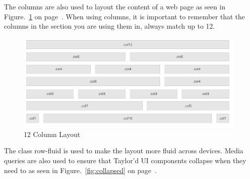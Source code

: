 The columns are also used to layout the content of a web page as seen in Figure.~\ref{fig:columnlayout} on  page~\pageref{fig:columnlayout}. When using columns, it is important to remember that the columns in the section you are using them in, always match up to 12.

\begin{figure}[h]
\centering
  \includegraphics[scale=0.4]{images/columnlayout}
  \caption{12 Column Layout}
  \label{fig:columnlayout}
\end{figure} 

The class row-fluid is used to make the layout more fluid across devices. Media queries are also used to ensure that Taylor'd UI components collapse when they need to as seen in Figure.~\ref{fig:collapsed} on  page~\pageref{fig:collapsed}. 


